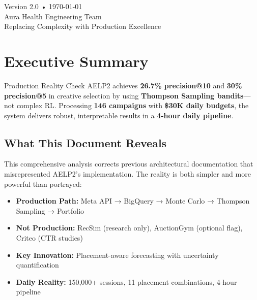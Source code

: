 \documentclass[11pt,a4paper]{report}
\begin{document}
\begin{titlepage}
\begin{center}

        \vspace{2.5cm}
        {\Large\color{aelpgray} Version 2.0 • \today}\\[0.5cm]
        {\large\color{aelpgray} Aura Health Engineering Team}\\[0.3cm]
        {\small\color{aelpgray} Replacing Complexity with Production Excellence}
    \end{center}
\end{titlepage}

\chapter*{Executive Summary}

\begin{insightbox}{Production Reality Check}
AELP2 achieves \textbf{26.7\% precision@10} and \textbf{30\% precision@5} in creative selection by using \textbf{Thompson Sampling bandits}—not complex RL. Processing \textbf{146 campaigns} with \textbf{\$30K daily budgets}, the system delivers robust, interpretable results in a \textbf{4-hour daily pipeline}.
\end{insightbox}

\section*{What This Document Reveals}

This comprehensive analysis corrects previous architectural documentation that misrepresented AELP2's implementation. The reality is both simpler and more powerful than portrayed:

\begin{itemize}[leftmargin=*]
    \item \textbf{Production Path:} Meta API → BigQuery → Monte Carlo → Thompson Sampling → Portfolio
    \item \textbf{Not Production:} RecSim (research only), AuctionGym (optional flag), Criteo (CTR studies)
    \item \textbf{Key Innovation:} Placement-aware forecasting with uncertainty quantification
    \item \textbf{Daily Reality:} 150,000+ sessions, 11 placement combinations, 4-hour pipeline
\end{itemize}
\end{document}
